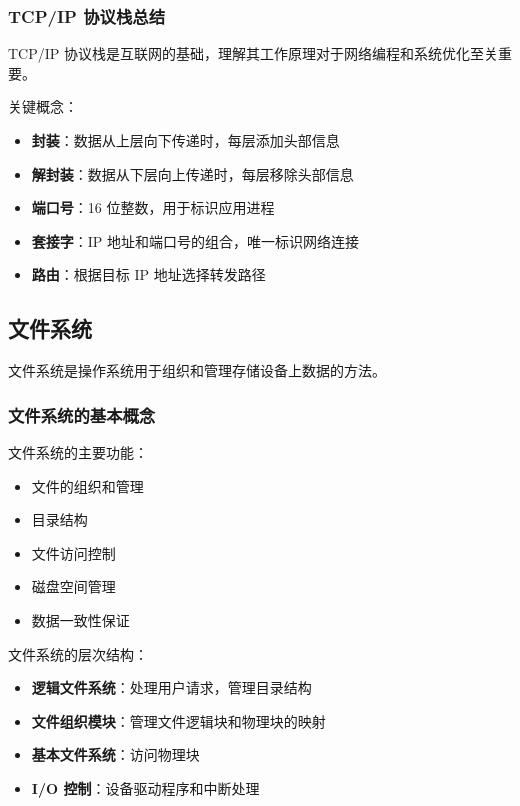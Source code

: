 \subsubsection{TCP/IP 协议栈总结}

TCP/IP 协议栈是互联网的基础，理解其工作原理对于网络编程和系统优化至关重要。

关键概念：
\begin{itemize}
  \item \textbf{封装}：数据从上层向下传递时，每层添加头部信息
  \item \textbf{解封装}：数据从下层向上传递时，每层移除头部信息
  \item \textbf{端口号}：16 位整数，用于标识应用进程
  \item \textbf{套接字}：IP 地址和端口号的组合，唯一标识网络连接
  \item \textbf{路由}：根据目标 IP 地址选择转发路径
\end{itemize}

\subsection{文件系统}

文件系统是操作系统用于组织和管理存储设备上数据的方法。

\subsubsection{文件系统的基本概念}


文件系统的主要功能：
\begin{itemize}
  \item 文件的组织和管理
  \item 目录结构
  \item 文件访问控制
  \item 磁盘空间管理
  \item 数据一致性保证
\end{itemize}

文件系统的层次结构：
\begin{itemize}
  \item \textbf{逻辑文件系统}：处理用户请求，管理目录结构
  \item \textbf{文件组织模块}：管理文件逻辑块和物理块的映射
  \item \textbf{基本文件系统}：访问物理块
  \item \textbf{I/O 控制}：设备驱动程序和中断处理
\end{itemize}

